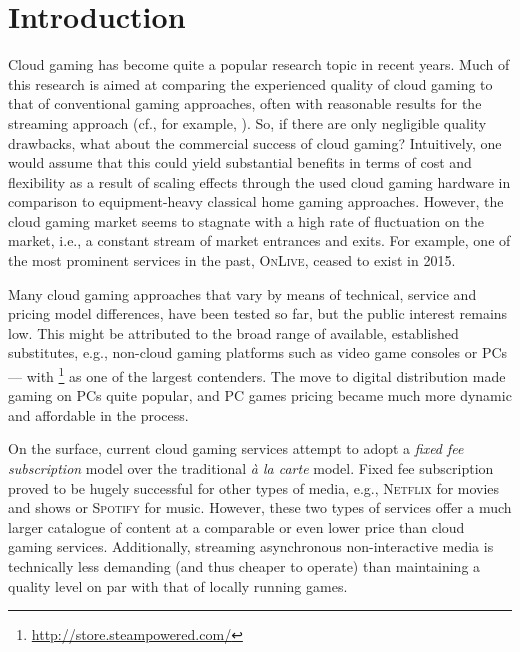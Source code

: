 

\section{Introduction}

Cloud gaming has become quite a popular research topic in recent years. Much of this research is aimed at comparing the experienced quality of cloud gaming to that of conventional gaming approaches, often with reasonable results for the streaming approach (cf., for example, \cite{5976180}). So, if there are only negligible quality drawbacks, what about the commercial success of cloud gaming? Intuitively, one would assume that this could yield substantial benefits in terms of cost and flexibility as a result of scaling effects through the used cloud gaming hardware in comparison to equipment-heavy classical home gaming approaches. However, the cloud gaming market seems to stagnate with a high rate of fluctuation on the market, i.e., a constant stream of market entrances and exits. For example, one of the most prominent services in the past, \textsc{OnLive}, ceased to exist in 2015.




Many cloud gaming approaches that vary by means of technical, service and pricing model differences, have been tested so far, but the public interest remains low. This might be attributed to the broad range of available, established substitutes, e.g., non-cloud gaming platforms such as video game consoles or PCs --- with \steam\footnote{\url{http://store.steampowered.com/}} as one of the largest contenders. The move to digital distribution made gaming on PCs quite popular, and PC games pricing became much more dynamic and affordable in the process.

On the surface, current cloud gaming services attempt to adopt a \textit{fixed fee subscription} model over the traditional \textit{à la carte} model. Fixed fee subscription proved to be hugely successful for other types of media, e.g., \textsc{Netflix} for movies and shows or \textsc{Spotify} for music. However, these two types of services offer a much larger catalogue of content at a comparable or even lower price than cloud gaming services. Additionally, streaming asynchronous non-interactive media is technically less demanding (and thus cheaper to operate) than maintaining a quality level on par with that of locally running games.

